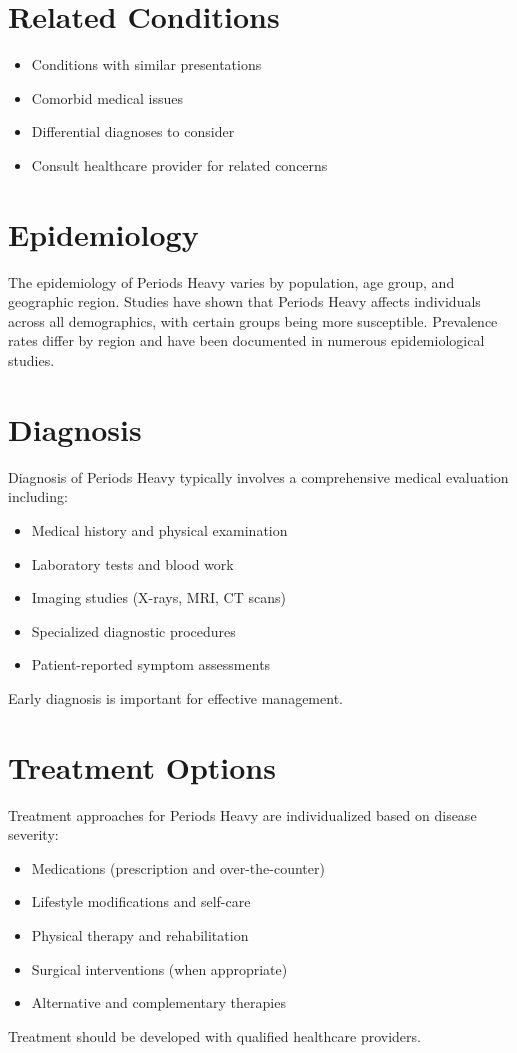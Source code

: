 \section*{Related Conditions}
\begin{itemize}
  \item Conditions with similar presentations
  \item Comorbid medical issues
  \item Differential diagnoses to consider
  \item Consult healthcare provider for related concerns
\end{itemize}

\section*{Epidemiology}
The epidemiology of Periods Heavy varies by population, age group, and geographic region. Studies have shown that Periods Heavy affects individuals across all demographics, with certain groups being more susceptible. Prevalence rates differ by region and have been documented in numerous epidemiological studies.

\section*{Diagnosis}
Diagnosis of Periods Heavy typically involves a comprehensive medical evaluation including:
\begin{itemize}
  \item Medical history and physical examination
  \item Laboratory tests and blood work
  \item Imaging studies (X-rays, MRI, CT scans)
  \item Specialized diagnostic procedures
  \item Patient-reported symptom assessments
\end{itemize}
Early diagnosis is important for effective management.

\section*{Treatment Options}
Treatment approaches for Periods Heavy are individualized based on disease severity:
\begin{itemize}
  \item Medications (prescription and over-the-counter)
  \item Lifestyle modifications and self-care
  \item Physical therapy and rehabilitation
  \item Surgical interventions (when appropriate)
  \item Alternative and complementary therapies
\end{itemize}
Treatment should be developed with qualified healthcare providers.

